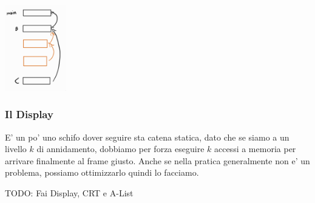\begin{center}
  \includegraphics[width=0.2\textwidth]{img/2025-03-06-13-14-42.png}
\end{center}

\subsubsection{Il Display}

E' un po' uno schifo dover seguire sta catena statica, dato che se siamo a un livello $ k $ di annidamento, dobbiamo per forza eseguire $ k $ accessi a memoria per arrivare finalmente al frame giusto. Anche se nella pratica generalmente non e' un problema, possiamo ottimizzarlo quindi lo facciamo.

TODO: Fai Display, CRT e A-List

% 
